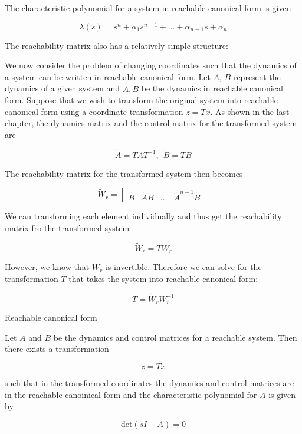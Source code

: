 The characteristic polynomial for a system in reachable canonical form is given

\begin{equation}
\lambda(s) = s^n +\alpha_1s^{n-1}+ \dots + \alpha_{n-1}s + \alpha_n
\end{equation}

The reachability matrix also has a relatively simple structure:

We now consider the problem of changing coordinates such that the dynamics
of a system can be written in reachable canonical form. Let $A$, $B$ represent the
dynamics of a given system and $\tilde{A}, \tilde{B}$ be the dynamics in reachable canonical form.
Suppose that we wish to transform the original system into reachable canonical
form using a coordinate transformation $z = Tx$. As shown in the last chapter, the
dynamics matrix and the control matrix for the transformed system are


\begin{equation}
\tilde{A} = TAT^{-1}, ~~ \tilde{B} = TB
\end{equation}

The reachability matrix for the transformed system then becomes

\begin{equation}
\tilde{W}_r = \begin{bmatrix}
 \tilde{B} & \tilde{A}\tilde{B} & \ldots & \tilde{A}^{n-1}\tilde{B} 
\end{bmatrix}
\end{equation}

We can transforming each element individually and thus get the reachability matrix fro the transformed system

\begin{equation}
\tilde{W}_r = TW_r
\end{equation}

However, we know that $W_r$ is invertible. Therefore we can solve for the transformation $T$ that takes the system into reachable canonical form:

\begin{equation}
T = \tilde{W}_r W_{r}^{-1}
\end{equation}


\begin{framed}
\theoremstyle{theorem}
\begin{theorem}{Reachable canonical form}

Let $A$ and $B$ be the dynamics and control matrices for a reachable system. Then there exists a transformation

\begin{equation}
z = Tx \nonumber
\end{equation}

such that in the transformed coordinates  the dynamics and control matrices are in the reachable 
canoinical form and the characteristic polynomial for $A$ is given by

\begin{equation}
\text{det}(sI-A) = 0 \nonumber
\end{equation}

\end{theorem}
\end{framed}


